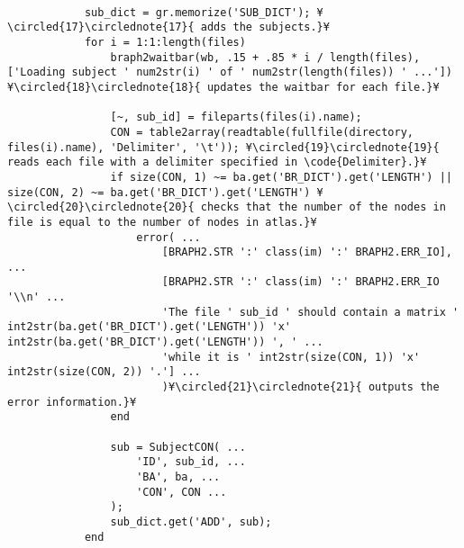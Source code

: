 \documentclass{tufte-handout}
\begin{document}
\begin{lstlisting}
            
            sub_dict = gr.memorize('SUB_DICT'); ¥\circled{17}\circlednote{17}{ adds the subjects.}¥
            for i = 1:1:length(files)
                braph2waitbar(wb, .15 + .85 * i / length(files), ['Loading subject ' num2str(i) ' of ' num2str(length(files)) ' ...']) ¥\circled{18}\circlednote{18}{ updates the waitbar for each file.}¥

                [~, sub_id] = fileparts(files(i).name);
                CON = table2array(readtable(fullfile(directory, files(i).name), 'Delimiter', '\t')); ¥\circled{19}\circlednote{19}{ reads each file with a delimiter specified in \code{Delimiter}.}¥
                if size(CON, 1) ~= ba.get('BR_DICT').get('LENGTH') || size(CON, 2) ~= ba.get('BR_DICT').get('LENGTH') ¥\circled{20}\circlednote{20}{ checks that the number of the nodes in file is equal to the number of nodes in atlas.}¥
                    error( ...
                        [BRAPH2.STR ':' class(im) ':' BRAPH2.ERR_IO], ...
                        [BRAPH2.STR ':' class(im) ':' BRAPH2.ERR_IO '\\n' ...
                        'The file ' sub_id ' should contain a matrix ' int2str(ba.get('BR_DICT').get('LENGTH')) 'x' int2str(ba.get('BR_DICT').get('LENGTH')) ', ' ...
                        'while it is ' int2str(size(CON, 1)) 'x' int2str(size(CON, 2)) '.'] ...
                        )¥\circled{21}\circlednote{21}{ outputs the error information.}¥
                end
                
                sub = SubjectCON( ...
                    'ID', sub_id, ...
                    'BA', ba, ...
                    'CON', CON ...
                );
                sub_dict.get('ADD', sub);
            end
            

\end{lstlisting}
\end{document}
